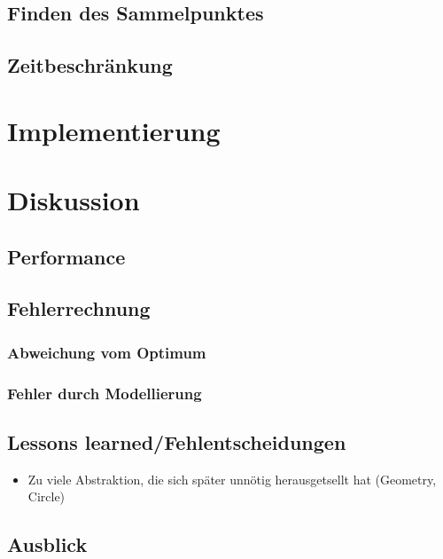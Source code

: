 \documentclass{article}
\begin{document}
\subsection{Finden des Sammelpunktes}

\subsection{Zeitbeschränkung}

\clearpage
\section{Implementierung}


\clearpage
\section{Diskussion}

\subsection{Performance}

\subsection{Fehlerrechnung}

\subsubsection{Abweichung vom Optimum}

\subsubsection{Fehler durch Modellierung}

\subsection{Lessons learned/Fehlentscheidungen}

\begin{itemize}
\item Zu viele Abstraktion, die sich später unnötig herausgetsellt hat (Geometry, Circle)
\end{itemize}

\subsection{Ausblick}
\end{document}
